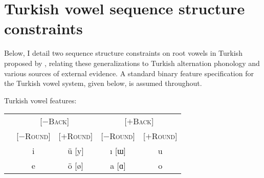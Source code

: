 \section{Turkish vowel sequence structure constraints}

Below, I detail two sequence structure constraints on root vowels in Turkish proposed by \citet{Lees1966a,Lees1966b}, relating these generalizations to Turkish alternation phonology and various sources of external evidence. A standard binary feature specification for the Turkish vowel system, given below, is assumed throughout.

\ex Turkish vowel features: \vspace{6pt} \\
\begin{tabular}{c | c c c c}
                       & \multicolumn{2}{c}{[$-$\textsc{Back}]} & \multicolumn{2}{c}{[$+$\textsc{Back}]} \\
                       & [$-$\textsc{Round}] & [$+$\textsc{Round}] & [$-$\textsc{Round}] & [$+$\textsc{Round}] \\ \midrule
{} & i & ü [y] & ı [ɯ] & u \\
 & e & ö [ø] & a [ɑ] & o \\
\end{tabular} \xe




